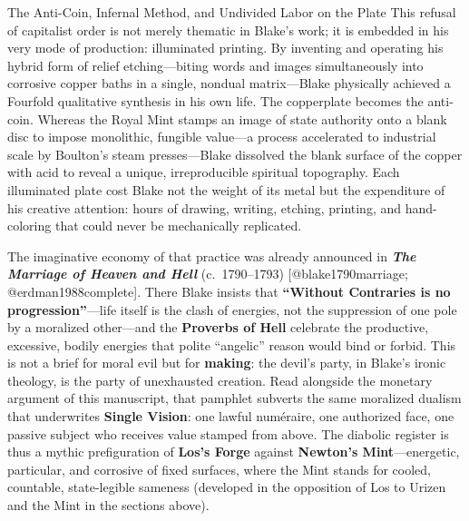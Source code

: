 \documentclass[
  ignorenonframetext,
]{beamer}
\begin{document}
\begin{frame}{The Anti-Coin, Infernal Method, and Undivided Labor on the
Plate}
\protect{}\label{the-anti-coin-infernal-method-and-undivided-labor-on-the-plate}
This refusal of capitalist order is not merely thematic in Blake's work;
it is embedded in his very mode of production: illuminated printing. By
inventing and operating his hybrid form of relief etching---biting words
and images simultaneously into corrosive copper baths in a single,
nondual matrix---Blake physically achieved a Fourfold qualitative
synthesis in his own life. The copperplate becomes the anti-coin.
Whereas the Royal Mint stamps an image of state authority onto a blank
disc to impose monolithic, fungible value---a process accelerated to
industrial scale by Boulton's steam presses---Blake dissolved the blank
surface of the copper with acid to reveal a unique, irreproducible
spiritual topography. Each illuminated plate cost Blake not the weight
of its metal but the expenditure of his creative attention: hours of
drawing, writing, etching, printing, and hand-coloring that could never
be mechanically replicated.

The imaginative economy of that practice was already announced in
\textbf{\emph{The Marriage of Heaven and Hell}} (c.~1790--1793)
{[}@blake1790marriage; @erdman1988complete{]}. There Blake insists that
\textbf{``Without Contraries is no progression''}---life itself is the
clash of energies, not the suppression of one pole by a moralized
other---and the \textbf{Proverbs of Hell} celebrate the productive,
excessive, bodily energies that polite ``angelic'' reason would bind or
forbid. This is not a brief for moral evil but for \textbf{making}: the
devil's party, in Blake's ironic theology, is the party of unexhausted
creation. Read alongside the monetary argument of this manuscript, that
pamphlet subverts the same moralized dualism that underwrites
\textbf{Single Vision}: one lawful numéraire, one authorized face, one
passive subject who receives value stamped from above. The diabolic
register is thus a mythic prefiguration of \textbf{Los's Forge} against
\textbf{Newton's Mint}---energetic, particular, and corrosive of fixed
surfaces, where the Mint stands for cooled, countable, state-legible
sameness (developed in the opposition of Los to Urizen and the Mint in
the sections above).


\end{frame}
\end{document}
